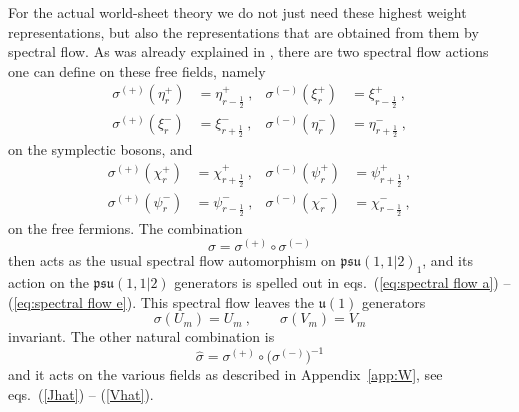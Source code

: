 \documentclass[a4paper,11pt]{article}
\numberwithin{equation}{section}
\def\be{\begin{equation}}
\def\ee{\end{equation}}
\begin{document}
For the actual world-sheet theory we do not just need these highest weight representations, but also the representations that are obtained from them by spectral flow. As was already explained in \cite{Eberhardt:2018ouy}, there are two spectral flow actions one can define on these free fields, namely 
\begin{subequations}
\begin{align}
\sigma^{(+)} (\eta^+_r)&=\eta^+_{r-\frac{1}{2}}\ , & \sigma^{(-)} (\xi^+_r)&=\xi^+_{r-\frac{1}{2}}\ , \label{eq:spectral flow 1}\\
\sigma^{(+)} (\xi^-_r)&=\xi^-_{r+\frac{1}{2}}\ , & \sigma^{(-)} (\eta^-_r)&=\eta^-_{r+\frac{1}{2}}\ , \label{eq:spectral flow 2}
\end{align}
\end{subequations}
on the symplectic bosons, and 
\begin{subequations}
\begin{align}
\sigma^{(+)} (\chi^+_r)&=\chi^+_{r+\frac{1}{2}}\ , & \sigma^{(-)} (\psi^+_r)&=\psi^+_{r+\frac{1}{2}}\ , \label{eq:spectral flow 1f}\\
\sigma^{(+)} (\psi^-_r)&=\psi^-_{r-\frac{1}{2}}\ , & \sigma^{(-)} (\chi^-_r)&=\chi^-_{r-\frac{1}{2}}\ ,\label{eq:spectral flow 2f}
\end{align}
\end{subequations}
on the free fermions. The combination 
\be
\sigma = \sigma^{(+)} \circ \sigma^{(-)} 
\ee
then acts as the usual spectral flow automorphism on $\mathfrak{psu}(1,1|2)_1$, and its action on the $\mathfrak{psu}(1,1|2)$ generators is spelled out in eqs.~(\ref{eq:spectral flow a}) -- (\ref{eq:spectral flow e}). This spectral flow leaves the $\mathfrak{u}(1)$ generators 
\be
\sigma (U_m) = U_m \ , \qquad \sigma(V_m) = V_m 
\ee
invariant. The other natural combination is 
\be
\hat{\sigma} = \sigma^{(+)} \circ \bigl( \sigma^{(-)}  \bigr)^{-1} 
\ee
and it acts on the various fields as described in Appendix~\ref{app:W}, see eqs.~(\ref{Jhat}) -- (\ref{Vhat}). 
\end{document}
